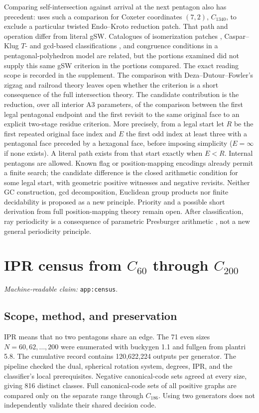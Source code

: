 \documentclass[11pt]{amsart}
\newcommand{\record}[1]{\nolinkurl{#1}}
\newcommand{\claimid}[1]{\par\nopagebreak\noindent\textit{Machine-readable claim:} \record{#1}.\par}
\begin{document}
Comparing self-intersection against arrival at the next pentagon also
has precedent: \cite[Section 6, Fig.~5]{Growing} uses such a comparison
for Coxeter coordinates $(7,2)$, $C_{1340}$, to exclude a particular
twisted Endo--Kroto reduction patch. That path and operation differ from
literal gSW. Catalogues of isomerization patches \cite{Patches},
Caspar--Klug $T$- and gcd-based classifications \cite{Capsids}, and
congruence conditions in a pentagonal-polyhedron model \cite{Pentagonal}
are related, but the portions examined did not supply this same gSW
criterion in the portions compared. The exact reading scope is
recorded in the supplement.
The comparison with Deza--Dutour--Fowler's zigzag and railroad
theory \cite{Knots} leaves open whether the criterion is a short
consequence of the full intersection theory. The candidate contribution is the reduction, over all interior A3
parameters, of the comparison between the first legal pentagonal
endpoint and the first revisit to the same original face to an explicit
two-stage residue criterion. More precisely, from a legal start let
$R$ be the first repeated original face index and $E$ the first odd
index at least three with a pentagonal face preceded by a hexagonal
face, before imposing simplicity ($E=\infty$ if none exists). A literal path exists from that
start exactly when $E<R$. Internal pentagons are allowed. Known flag
or position-mapping encodings already permit a finite search; the
candidate difference is the closed arithmetic condition for some
legal start, with geometric positive witnesses and negative revisits.
Neither GC construction, gcd decomposition, Euclidean group products
nor finite decidability is proposed as a new principle. Priority and a
possible short derivation from full position-mapping theory remain open.
After classification, ray periodicity is a consequence of parametric
Presburger arithmetic \cite[Theorem 1.15, Property 1]{BGW}, not a new
general periodicity principle.

\appendix
\section{IPR census from \texorpdfstring{$C_{60}$}{C60} through \texorpdfstring{$C_{200}$}{C200}}\label{app:census}
\claimid{app:census}
\subsection{Scope, method, and preservation}
IPR means that no two pentagons share an edge. The 71 even sizes
$N=60,62,\ldots,200$ were enumerated with buckygen 1.1 and fullgen
from plantri 5.8. The cumulative record contains 120,622,224
outputs per generator. The pipeline checked the dual, spherical
rotation system, degrees, IPR, and the classifier's local prerequisites.
Negative canonical-code sets agreed at every size, giving 816 distinct
classes. Full canonical-code sets of all positive graphs are compared
only on the separate range through $C_{186}$. Using two generators does not independently
validate their shared decision code.
\end{document}
